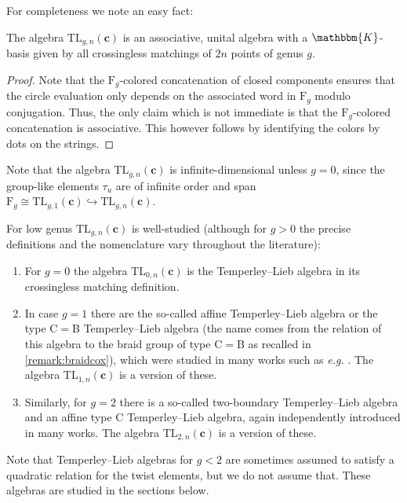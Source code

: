 \documentclass[a4paper,11pt]{amsart}
\newcommand{\eg}{\textsl{e.g.}}
\newcommand{\setstuff}[1]{\mathrm{#1}}
\newcommand{\KK}{\mathbbm{K}}
\newcommand{\bsym}[1]{\boldsymbol{#1}}
\newcommand{\cpar}{\bsym{c}}
\numberwithin{equation}{section}
\let\fullref\autoref
\begin{document}
For completeness we note an easy fact:

\begin{lemma}\label{lemma:tl-basis}
The algebra $\setstuff{TL}_{g,n}(\cpar)$ is an associative, unital 
algebra with a $\KK$-basis given by all crossingless 
matchings of $2n$ points of genus $g$.
\end{lemma}

\begin{proof}
Note that the $\setstuff{F}_{g}$-colored 
concatenation of closed components ensures that the 
circle evaluation only depends on the associated word in $\setstuff{F}_{g}$ 
modulo conjugation.
Thus, the only claim which is not immediate is 
that the $\setstuff{F}_{g}$-colored 
concatenation is associative. This however follows 
by identifying the colors by dots on the strings.
\end{proof}

Note that the algebra $\setstuff{TL}_{g,n}(\cpar)$ is 
infinite-dimensional unless $g=0$, since the group-like elements $\tau_{u}$ 
are of infinite order and span $\setstuff{F}_{g}\cong
\setstuff{TL}_{g,1}(\cpar)\hookrightarrow\setstuff{TL}_{g,n}(\cpar)$.

\begin{remark}\label{remark:tl}
For low genus $\setstuff{TL}_{g,n}(\cpar)$ is well-studied 
(although for $g>0$ the precise definitions and the 
nomenclature vary 
throughout the literature):
\begin{enumerate}

\setlength\itemsep{0.15cm}

\item For $g=0$ the algebra 
$\setstuff{TL}_{0,n}(\cpar)$ is the 
Temperley--Lieb algebra in its crossingless matching definition.

\item In case $g=1$ there are the so-called 
affine Temperley--Lieb algebra or the
type C$=$B Temperley--Lieb algebra 
(the name comes from the relation of this algebra 
to the braid group of type C$=$B
as recalled in \fullref{remark:braidcox}), 
which were studied in many works such as {\eg} \cite{GrLe-affine-tl}.
The algebra $\setstuff{TL}_{1,n}(\cpar)$ is a version of these.

\item Similarly, for 
$g=2$ there is a so-called two-boundary 
Temperley--Lieb algebra 
and an affine type C Temperley--Lieb 
algebra, again independently 
introduced in many works.
The algebra $\setstuff{TL}_{2,n}(\cpar)$ 
is a version of these.

\end{enumerate}
Note that Temperley--Lieb algebras for $g<2$
are sometimes assumed to satisfy a quadratic relation for the twist 
elements, but we do not assume that.
These algebras are studied in 
the sections below.
\end{remark}
\end{document}
